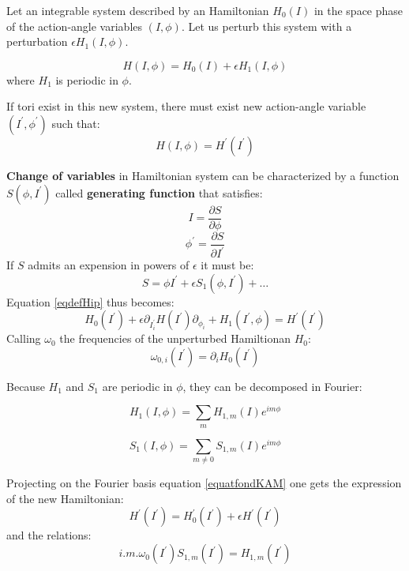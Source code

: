 \documentclass[12pt]{book}
\begin{document}
Let an integrable system described by an Hamiltonian $H_0(I)$ in the
space phase of the action-angle variables $(I,\phi)$.
Let us perturb this system with a perturbation $\epsilon H_1(I,\phi)$.

\begin{equation}
H(I,\phi)=H_0(I)+\epsilon H_1(I,\phi)
\end{equation}
where $H_1$ is periodic in $\phi$.

If tori exist in this new system, there must exist new action-angle
variable $(I^\prime,\phi^\prime)$ such that:
\begin{equation}\label{eqdefHip}
H(I,\phi)=H^\prime(I^\prime)
\end{equation}

{\bf Change of variables} in Hamiltonian system can be
characterized\cite{ph:mecac:Goldstein80} by a
function $S(\phi,I^\prime)$ called {\bf generating function} that
satisfies: 
\begin{equation}
I=\frac{\partial S}{\partial \phi}
\end{equation}
\begin{equation}
\phi^\prime=\frac{\partial S}{\partial I^\prime}
\end{equation}
If $S$ admits an expension in powers of $\epsilon$ it must be:
\begin{equation}
S=\phi I^\prime+\epsilon S_1(\phi,I^\prime)+\dots
\end{equation}
Equation \ref{eqdefHip} thus becomes:
\begin{equation}\label{equatfondKAM}
H_0(I^\prime)+\epsilon\partial_{I^\prime_i}H(I^\prime)\partial_{\phi_i}
+H_1(I^\prime,\phi)=H^\prime(I^\prime)
\end{equation}
Calling $\omega_0$ the frequencies of the unperturbed Hamiltionan
$H_0$:
\begin{equation}
\omega_{0,i}(I^\prime)=\partial_iH_0(I^\prime)
\end{equation}

Because $H_1$ and $S_1$ are periodic in $\phi$, they can be decomposed
in Fourier:

\begin{equation}
H_1(I,\phi)=\sum_m H_{1,m}(I)e^{im\phi}
\end{equation}

\begin{equation}
S_1(I,\phi)=\sum_{m\neq 0} S_{1,m}(I)e^{im\phi}
\end{equation}

Projecting on the Fourier basis equation \ref{equatfondKAM} one gets
the expression of the new Hamiltonian:
\begin{equation}
H^\prime(I^\prime)=H_0^\prime(I^\prime)+\epsilon H^\prime(I^\prime)
\end{equation}
and the relations:
\begin{equation}
i.m.\omega_0(I^\prime) S_{1,m}(I^\prime)=H_{1,m}(I^\prime)
\end{equation}
\end{document}
